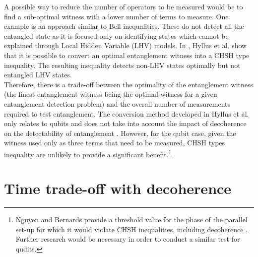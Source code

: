 \documentclass[%
 reprint,
 superscriptaddress,
 amsmath,
 amssymb,
 aps,
 longbibliography
]{revtex4-2}
\begin{document}
\begin{appendices}
\indent A possible way to reduce the number of operators to be measured would be to find a sub-optimal witness with a lower number of terms to measure. One example is an approach similar to Bell inequalities. These do not detect all the entangled state as it is focused only on identifying states which cannot be explained through Local Hidden Variable (LHV) models. In \cite{Hyllus2005}, Hyllus et al. show that it is possible to convert an optimal entanglement witness into a CHSH type inequality. The resulting inequality detects non-LHV states optimally but not entangled LHV states.\\
\indent Therefore, there is a trade-off between the optimality of the entanglement witness (the finest entanglement witness being the optimal witness for a given entanglement detection problem) and the overall number of measurements required to test entanglement. The conversion method developed in Hyllus et al. only relates to qubits and does not take into account the impact of decoherence on the detectability of entanglement \cite{Hyllus2005}. However, for the qubit case, given the witness used only as three terms that need to be measured, CHSH types inequality are unlikely to provide a significant benefit.\footnote{Nguyen and Bernards provide a threshold value for the phase of the parallel set-up for which it would violate CHSH inequalities, including decoherence \cite{Nguyen2019}. Further research would be necessary in order to conduct a similar test for qudits.}  

\section{Time trade-off with decoherence} \label{sec:time_opt}


\end{appendices}
\end{document}
